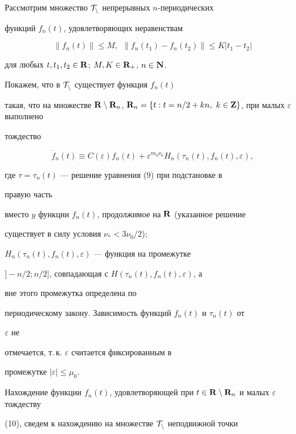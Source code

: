 \begin{pf} 


Рассмотрим множество $\cal T_n$ непрерывных $n$-периодических 


функций $f_n(t)$, удовлетворяющих неравенствам 


$$ 


\|f_n(t)\|\le M, \ \ \|f_n(t_1)-f_n(t_2)\| 


\le K|t_1-t_2| 


$$ 


для любых $t,t_1,t_2\in\bold R$; $M,K\in\bold R_+$, $n\in\bold N$. 


Покажем, что в $\cal T_n$ существует функция $f_n(t)$ 


такая, что на множестве $\bold R\setminus\bold R_n$, $\bold 


R_n=\{t:t=n/2+k n,\ k\in\bold Z\}$, при малых $\varepsilon$ выполнено 


тождество 


\begin{equation} 


\Dot f_n(t)\equiv C(\varepsilon)f_n(t)+\varepsilon^{m_0\nu_0} 


H_n(\tau_n(t),f_n(t),\varepsilon), 


\end{equation} 


где $\tau=\tau_n(t)$ --- решение уравнения (9) при подстановке в 


правую часть 


вместо $y$ функции $f_n(t)$, продолжимое на $\bold R$ (указанное решение 


существует в силу условия $\nu_*<3\nu_0/2$); 


$H_n(\tau_n(t),f_n(t),\varepsilon)$ --- функция на промежутке 


$]-n/2;n/2]$, совпадающая с $H(\tau_n(t),f_n(t),\varepsilon)$, а 


вне этого промежутка определена по 


периодическому закону. Зависимость функций $f_n(t)$ и $\tau_n(t)$ от 


$\varepsilon$ не 


отмечается, т.\,к. $\varepsilon$ считается фиксированным в 


промежутке $|\varepsilon|\le\mu_0$. 


Нахождение функции $f_n(t)$, удовлетворяющей при $t\in\bold 


R\setminus\bold R_n$ и малых $\varepsilon$ тождеству 


(10), сведем к нахождению на множестве $\cal T_n$ неподвижной точки 



\end{pf}
